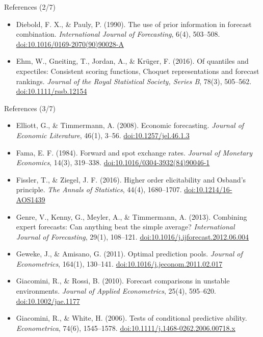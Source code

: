\begin{frame}{References (2/7)}
\begin{itemize}
    \item Diebold, F. X., \& Pauly, P. (1990). The use of prior information in forecast combination. \textit{International Journal of Forecasting}, 6(4), 503--508. \href{https://doi.org/10.1016/0169-2070(90)90028-A}{doi:10.1016/0169-2070(90)90028-A}
    \item Ehm, W., Gneiting, T., Jordan, A., \& Krüger, F. (2016). Of quantiles and expectiles: Consistent scoring functions, Choquet representations and forecast rankings. \textit{Journal of the Royal Statistical Society, Series B}, 78(3), 505--562. \href{https://doi.org/10.1111/rssb.12154}{doi:10.1111/rssb.12154}
\end{itemize}
\end{frame}

\begin{frame}{References (3/7)}
\itemsize{\tiny}
\begin{itemize}
    \item Elliott, G., \& Timmermann, A. (2008). Economic forecasting. \textit{Journal of Economic Literature}, 46(1), 3--56. \href{https://doi.org/10.1257/jel.46.1.3}{doi:10.1257/jel.46.1.3}
    \item Fama, E. F. (1984). Forward and spot exchange rates. \textit{Journal of Monetary Economics}, 14(3), 319--338. \href{https://doi.org/10.1016/0304-3932(84)90046-1}{doi:10.1016/0304-3932(84)90046-1}
    \item Fissler, T., \& Ziegel, J. F. (2016). Higher order elicitability and Osband's principle. \textit{The Annals of Statistics}, 44(4), 1680--1707. \href{https://doi.org/10.1214/16-AOS1439}{doi:10.1214/16-AOS1439}
    \item Genre, V., Kenny, G., Meyler, A., \& Timmermann, A. (2013). Combining expert forecasts: Can anything beat the simple average? \textit{International Journal of Forecasting}, 29(1), 108--121. \href{https://doi.org/10.1016/j.ijforecast.2012.06.004}{doi:10.1016/j.ijforecast.2012.06.004}
    \item Geweke, J., \& Amisano, G. (2011). Optimal prediction pools. \textit{Journal of Econometrics}, 164(1), 130--141. \href{https://doi.org/10.1016/j.jeconom.2011.02.017}{doi:10.1016/j.jeconom.2011.02.017}
    \item Giacomini, R., \& Rossi, B. (2010). Forecast comparisons in unstable environments. \textit{Journal of Applied Econometrics}, 25(4), 595--620. \href{https://doi.org/10.1002/jae.1177}{doi:10.1002/jae.1177}
    \item Giacomini, R., \& White, H. (2006). Tests of conditional predictive ability. \textit{Econometrica}, 74(6), 1545--1578. \href{https://doi.org/10.1111/j.1468-0262.2006.00718.x}{doi:10.1111/j.1468-0262.2006.00718.x}

\end{itemize}
\end{frame}
